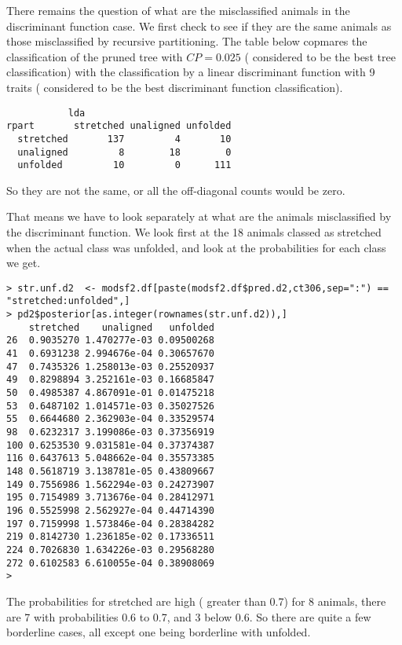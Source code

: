 \documentclass[titlepage]{article}  %
\begin{document}
There remains the  question of what are the misclassified animals in the discriminant function case. We first check to see if they are the same animals as those misclassified by recursive partitioning. The table below copmares the classification of the pruned tree with $CP=0.025$ ( considered to be the best tree classification) with the classification by a linear discriminant function with 9 traits ( considered to be the best discriminant function classification).
\begin{verbatim}
           lda
rpart       stretched unaligned unfolded
  stretched       137         4       10
  unaligned         8        18        0
  unfolded         10         0      111
\end{verbatim}
 So they are not the same, or all the off-diagonal counts would be zero.

That means we have to look separately at what are the animals misclassified by the discriminant function. We look first at the 18 animals classed as stretched when the actual class was unfolded, and look at the probabilities for each class we get.
\begin{verbatim}
> str.unf.d2  <- modsf2.df[paste(modsf2.df$pred.d2,ct306,sep=":") == "stretched:unfolded",]
> pd2$posterior[as.integer(rownames(str.unf.d2)),]
    stretched    unaligned   unfolded
26  0.9035270 1.470277e-03 0.09500268
41  0.6931238 2.994676e-04 0.30657670
47  0.7435326 1.258013e-03 0.25520937
49  0.8298894 3.252161e-03 0.16685847
50  0.4985387 4.867091e-01 0.01475218
53  0.6487102 1.014571e-03 0.35027526
55  0.6644680 2.362903e-04 0.33529574
98  0.6232317 3.199086e-03 0.37356919
100 0.6253530 9.031581e-04 0.37374387
116 0.6437613 5.048662e-04 0.35573385
148 0.5618719 3.138781e-05 0.43809667
149 0.7556986 1.562294e-03 0.24273907
195 0.7154989 3.713676e-04 0.28412971
196 0.5525998 2.562927e-04 0.44714390
197 0.7159998 1.573846e-04 0.28384282
219 0.8142730 1.236185e-02 0.17336511
224 0.7026830 1.634226e-03 0.29568280
272 0.6102583 6.610055e-04 0.38908069
> 
\end{verbatim}
The probabilities for stretched are high ( greater than 0.7) for 8 animals, there are 7 with probabilities 0.6 to 0.7, and 3 below 0.6. So there are quite a few borderline cases, all except one being  borderline with unfolded. 
\end{document}
